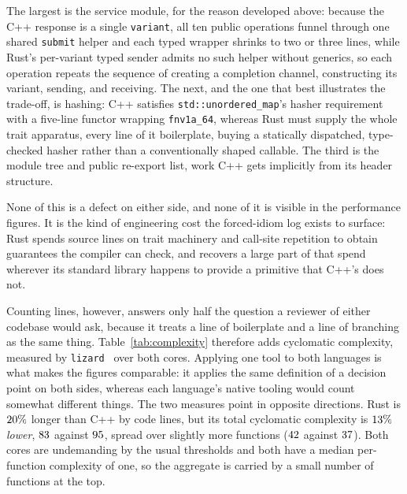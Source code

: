\documentclass[english,twoside,openright,a4paper,censored,csm,software-track-2020]{HYthesisML}
\begin{document}
The largest is the service module, for the reason developed above: because the C++ response is a
single \texttt{variant}, all ten public operations funnel through one shared \texttt{submit}
helper and each typed wrapper shrinks to two or three lines, while Rust's per-variant typed
sender admits no such helper without generics, so each operation repeats the sequence of
creating a completion channel, constructing its variant, sending, and receiving. The next, and
the one that best illustrates the trade-off, is hashing: C++ satisfies
\texttt{std::unordered\_map}'s hasher requirement with a five-line functor wrapping
\texttt{fnv1a\_64}, whereas Rust must supply the whole trait apparatus, every line of it
boilerplate, buying a statically dispatched, type-checked hasher rather than a conventionally
shaped callable. The third is the module tree and public re-export list, work C++ gets
implicitly from its header structure.

None of this is a defect on either side, and none of it is visible in the performance figures.
It is the kind of engineering cost the forced-idiom log exists to surface: Rust spends source
lines on trait machinery and call-site repetition to obtain guarantees the compiler can check,
and recovers a large part of that spend wherever its standard library happens to provide a
primitive that C++'s does not.

Counting lines, however, answers only half the question a reviewer of either codebase would
ask, because it treats a line of boilerplate and a line of branching as the same thing.
Table~\ref{tab:complexity} therefore adds cyclomatic complexity, measured by
\texttt{lizard}~\cite{lizard} over both cores. Applying one tool to both languages is what makes
the figures comparable: it applies the same definition of a decision point on both sides,
whereas each language's native tooling would count somewhat different things. The two measures
point in opposite directions. Rust is $20\%$ longer than C++ by code lines, but its
total cyclomatic complexity is $13\%$ \emph{lower}, $83$ against
$95$, spread over slightly more functions ($42$ against $37$). Both
cores are undemanding by the usual thresholds and both have a median per-function complexity
of one, so the aggregate is carried by a small number of functions at the top.
\end{document}
